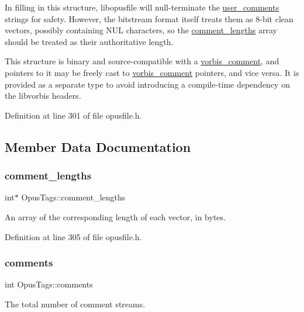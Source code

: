 In filling in this structure, {\ttfamily libopusfile} will null-\/terminate the \mbox{\hyperlink{struct_opus_tags_ad53d571bd8b23691089242e4e161358a}{user\+\_\+comments}} strings for safety. However, the bitstream format itself treats them as 8-\/bit clean vectors, possibly containing N\+UL characters, so the \mbox{\hyperlink{struct_opus_tags_aa99547abb03d7dbe0cd7095d8b706170}{comment\+\_\+lengths}} array should be treated as their authoritative length.

This structure is binary and source-\/compatible with a {\ttfamily \mbox{\hyperlink{structvorbis__comment}{vorbis\+\_\+comment}}}, and pointers to it may be freely cast to {\ttfamily \mbox{\hyperlink{structvorbis__comment}{vorbis\+\_\+comment}}} pointers, and vice versa. It is provided as a separate type to avoid introducing a compile-\/time dependency on the libvorbis headers. 

Definition at line 301 of file opusfile.\+h.



\subsection{Member Data Documentation}
\mbox{\label{struct_opus_tags_aa99547abb03d7dbe0cd7095d8b706170}} 
\subsubsection{\texorpdfstring{comment\_lengths}{comment\_lengths}}
{\footnotesize\ttfamily int$\ast$ Opus\+Tags\+::comment\+\_\+lengths}

An array of the corresponding length of each vector, in bytes. 

Definition at line 305 of file opusfile.\+h.

\mbox{\label{struct_opus_tags_a65c37166930a1f5d682fa6c863fc28c6}} 
\subsubsection{\texorpdfstring{comments}{comments}}
{\footnotesize\ttfamily int Opus\+Tags\+::comments}

The total number of comment streams. 

